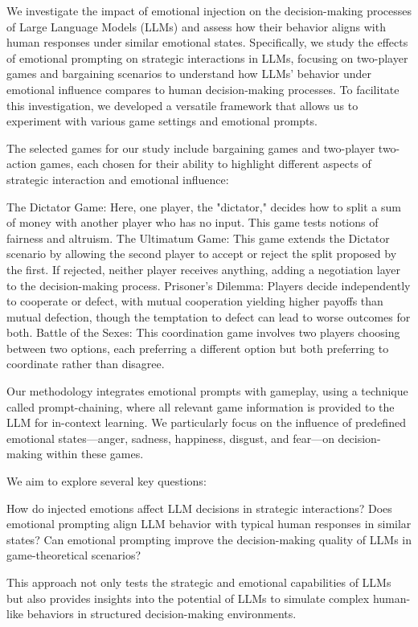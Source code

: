 \documentclass{article}
\begin{document}
We investigate the impact of emotional injection on the decision-making processes of Large Language Models (LLMs) and assess how their behavior aligns with human responses under similar emotional states. Specifically, we study the effects of emotional prompting on strategic interactions in LLMs, focusing on two-player games and bargaining scenarios to understand how LLMs' behavior under emotional influence compares to human decision-making processes. To facilitate this investigation, we developed a versatile framework that allows us to experiment with various game settings and emotional prompts.

The selected games for our study include bargaining games and two-player two-action games, each chosen for their ability to highlight different aspects of strategic interaction and emotional influence:

    The Dictator Game: Here, one player, the "dictator," decides how to split a sum of money with another player who has no input. This game tests notions of fairness and altruism.
    The Ultimatum Game: This game extends the Dictator scenario by allowing the second player to accept or reject the split proposed by the first. If rejected, neither player receives anything, adding a negotiation layer to the decision-making process.
    Prisoner's Dilemma: Players decide independently to cooperate or defect, with mutual cooperation yielding higher payoffs than mutual defection, though the temptation to defect can lead to worse outcomes for both.
    Battle of the Sexes: This coordination game involves two players choosing between two options, each preferring a different option but both preferring to coordinate rather than disagree.

Our methodology integrates emotional prompts with gameplay, using a technique called prompt-chaining, where all relevant game information is provided to the LLM for in-context learning. We particularly focus on the influence of predefined emotional states—anger, sadness, happiness, disgust, and fear—on decision-making within these games.

We aim to explore several key questions:

    How do injected emotions affect LLM decisions in strategic interactions?
    Does emotional prompting align LLM behavior with typical human responses in similar states?
    Can emotional prompting improve the decision-making quality of LLMs in game-theoretical scenarios?

This approach not only tests the strategic and emotional capabilities of LLMs but also provides insights into the potential of LLMs to simulate complex human-like behaviors in structured decision-making environments.
\end{document}
